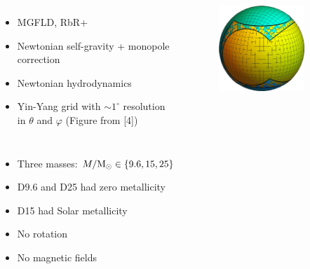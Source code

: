 \documentclass[aspectratio=169]{beamer}
\begin{document}
\begin{frame}

  \begin{columns}[c]

      \begin{itemize}
        \item MGFLD, RbR+
        \item Newtonian self-gravity + monopole correction
        \item Newtonian hydrodynamics
        \item Yin-Yang grid with $\sim1^{\circ}$
              resolution in $\theta$ and $\varphi$ (Figure from [4])
      \end{itemize}

      \begin{figure}
        \includegraphics[width=0.8\textwidth]{Figures/yinyang.png}
      \end{figure}

  \end{columns}

\end{frame}

\begin{frame}

  \begin{itemize}
    \item Three masses:
          $M/\mathrm{M}_{\odot}\in\left\{9.6,15,25\right\}$
    \item D9.6 and D25 had zero metallicity
    \item D15 had Solar metallicity
    \item No rotation
    \item No magnetic fields
  \end{itemize}

\end{frame}
\end{document}
